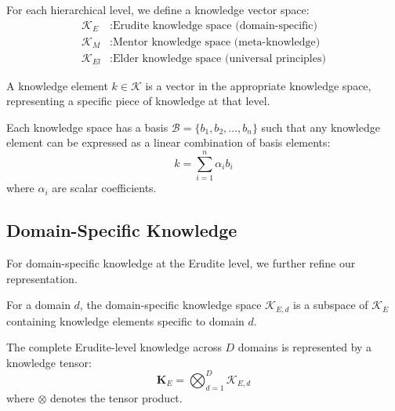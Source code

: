 \begin{definition}
For each hierarchical level, we define a knowledge vector space:
\begin{align}
\mathcal{K}_E &: \text{Erudite knowledge space (domain-specific)} \\
\mathcal{K}_M &: \text{Mentor knowledge space (meta-knowledge)} \\
\mathcal{K}_{El} &: \text{Elder knowledge space (universal principles)}
\end{align}
\end{definition}

\begin{definition}
A knowledge element $k \in \mathcal{K}$ is a vector in the appropriate knowledge space, representing a specific piece of knowledge at that level.
\end{definition}

\begin{definition}
Each knowledge space has a basis $\mathcal{B} = \{b_1, b_2, \ldots, b_n\}$ such that any knowledge element can be expressed as a linear combination of basis elements:
\begin{equation}
k = \sum_{i=1}^{n} \alpha_i b_i
\end{equation}
where $\alpha_i$ are scalar coefficients.
\end{definition}

\subsection{Domain-Specific Knowledge}

For domain-specific knowledge at the Erudite level, we further refine our representation.

\begin{definition}
For a domain $d$, the domain-specific knowledge space $\mathcal{K}_{E,d}$ is a subspace of $\mathcal{K}_E$ containing knowledge elements specific to domain $d$.
\end{definition}

\begin{definition}
The complete Erudite-level knowledge across $D$ domains is represented by a knowledge tensor:
\begin{equation}
\mathbf{K}_E = \bigotimes_{d=1}^{D} \mathcal{K}_{E,d}
\end{equation}
where $\otimes$ denotes the tensor product.
\end{definition}

